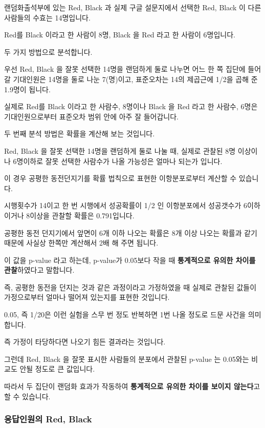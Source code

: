 \documentclass[
]{article}
\begin{document}
랜덤화출석부에 있는 Red, Black 과 실제 구글 설문지에서 선택한 Red, Black
이 다른 사람들의 수효는 14명입니다.

Red를 Black 이라고 한 사람이 8명, Black 을 Red 라고 한 사람이 6명입니다.

두 가지 방법으로 분석합니다.

우선 Red, Black 을 잘못 선택한 14명을 랜덤하게 둘로 나누면 어느 한 쪽
집단에 들어갈 기대인원은 14명을 둘로 나눈 7(명)이고, 표준오차는 14의
제곱근에 1/2을 곱해 준 1.9명이 됩니다.

실제로 Red를 Black 이라고 한 사람수, 8명이나 Black 을 Red 라고 한
사람수, 6명은 기대인원으로부터 표준오차 범위 안에 아주 잘 들어갑니다.

두 번째 분석 방법은 확률을 계산해 보는 것입니다.

Red, Black 을 잘못 선택한 14명을 랜덤하게 둘로 나눌 때, 실제로 관찰된
8명 이상이나 6명이하로 잘못 선택한 사람수가 나올 가능성은 얼마나 되는가
입니다.

이 경우 공평한 동전던지기를 확률 법칙으로 표현한 이항분포로부터 계산할
수 있습니다.

시행횟수가 14이고 한 번 시행에서 성공확률이 1/2 인 이항분포에서
성공갯수가 6이하이거나 8이상을 관찰할 확률은 0.791입니다.

공평한 동전 던지기에서 앞면이 6개 이하 나오는 확률은 8개 이상 나오는
확률과 같기 때문에 사실상 한쪽만 계산해서 2배 해 주면 됩니다.

이 값을 p-value 라고 하는데, p-value가 0.05보다 작을 때
\textbf{통계적으로 유의한 차이를 관찰}하였다고 말합니다.

즉, 공평한 동전을 던지는 것과 같은 과정이라고 가정하였을 때 실제로
관찰된 값들이 가정으로부터 얼마나 떨어져 있는지를 표현한 것입니다.

0.05, 즉 1/20은 이런 실험을 스무 번 정도 반복하면 1번 나올 정도로 드문
사건을 의미합니다.

즉 가정이 타당하다면 나오기 힘든 결과라는 것입니다.

그런데 Red, Black 을 잘못 표시한 사람들의 분포에서 관찰된 p-value 는
0.05와는 비교도 안될 정도로 큰 값입니다.

따라서 두 집단이 랜덤화 효과가 작동하여 \textbf{통계적으로 유의한 차이를
보이지 않는다}고 할 수 있습니다.

\subsubsection{응답인원의 Red,
Black}\label{uxc751uxb2f5uxc778uxc6d0uxc758-red-black}
\end{document}
